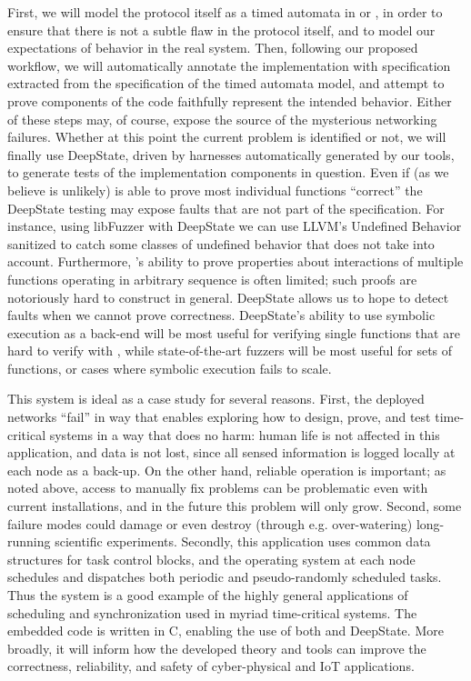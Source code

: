 First, we will model the protocol itself as a timed automata in \uppaal or \prism, in order to ensure that there is not a subtle flaw in the protocol itself, and to model our expectations of behavior in the real system.  Then, following our proposed workflow, we will automatically annotate the implementation with specification extracted from the specification of the timed automata model, and attempt to prove components of the code faithfully represent the intended behavior.  Either of these steps may, of course, expose the source of the mysterious networking failures.  Whether at this point the current problem is identified or not, we will finally use DeepState, driven by harnesses automatically generated by our tools, to generate tests of the implementation components in question.  Even if (as we believe is unlikely) \framac is able to prove most individual functions ``correct'' the DeepState testing may expose faults that are not part of the specification.  For instance, using libFuzzer with DeepState we can use LLVM's Undefined Behavior sanitized to catch some classes of undefined behavior that \framac does not take into account.  Furthermore, \framac's ability to prove properties about interactions of multiple functions operating in arbitrary sequence is often limited; such proofs are notoriously hard to construct in general.  DeepState allows us to hope to detect faults when we cannot prove correctness.  DeepState's ability to use symbolic execution as a back-end will be most useful for verifying single functions that are hard to verify with \framac, while state-of-the-art fuzzers will be most useful for sets of functions, or cases where symbolic execution fails to scale.

This system is ideal as a case study for several reasons. First, the deployed networks “fail” in way that enables exploring how to design, prove, and test time-critical systems in a way that does no harm: human life is not affected in this application, and data is not lost, since all sensed information is logged locally at each node as a back-up.  On the other hand, reliable operation is important; as noted above, access to manually fix problems can be problematic even with current installations, and in the future this problem will only grow.  Second, some failure modes could damage or even destroy (through e.g. over-watering) long-running scientific experiments.
Secondly, this application uses common data structures for task control blocks, and the operating system at each node schedules and dispatches both periodic and pseudo-randomly scheduled tasks. Thus the system is a good example of the highly general applications of scheduling and synchronization used in myriad time-critical systems.  The embedded code is written in C, enabling the use of both \framac and DeepState. More broadly, it will inform how the developed theory and tools can improve the correctness, reliability, and safety of cyber-physical and IoT applications.